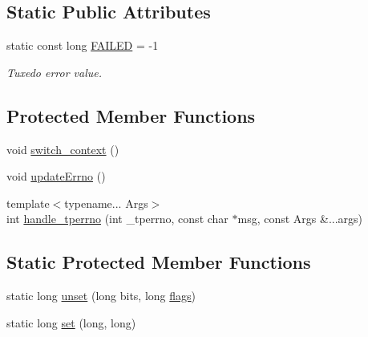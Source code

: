 \subsection*{Static Public Attributes}
\begin{DoxyCompactItemize}
\item 
static const long \hyperlink{classatmi_1_1tuxedo_a79d8805a077e30138729f44c75fcfa5d}{F\+A\+I\+L\+ED} = -\/1\hypertarget{classatmi_1_1tuxedo_a79d8805a077e30138729f44c75fcfa5d}{}\label{classatmi_1_1tuxedo_a79d8805a077e30138729f44c75fcfa5d}

\begin{DoxyCompactList}\small\item\em Tuxedo error value. \end{DoxyCompactList}\end{DoxyCompactItemize}
\subsection*{Protected Member Functions}
\begin{DoxyCompactItemize}
\item 
void \hyperlink{classatmi_1_1tuxedo_a90d83b2141d484744a82202f3f66a939}{switch\+\_\+context} ()
\item 
void \hyperlink{classatmi_1_1tuxedo_a1c1d7f2df43e4357788d03977548ac2e}{update\+Errno} ()
\item 
{\footnotesize template$<$typename... Args$>$ }\\int \hyperlink{classatmi_1_1tuxedo_ae8715aedf9c8f3178aec71e93ee35be4}{handle\+\_\+tperrno} (int \+\_\+tperrno, const char $\ast$msg, const Args \&...args)
\end{DoxyCompactItemize}
\subsection*{Static Protected Member Functions}
\begin{DoxyCompactItemize}
\item 
static long \hyperlink{classatmi_1_1tuxedo_af962caf2ded45e192ba6a37740b133d0}{unset} (long bits, long \hyperlink{classatmi_1_1tuxedo_adfebbea0b6599ba8ca87743c55157b82}{flags})
\item 
static long \hyperlink{classatmi_1_1tuxedo_a73c4c95f165a052ba5a3a29cb2834831}{set} (long, long)
\end{DoxyCompactItemize}
